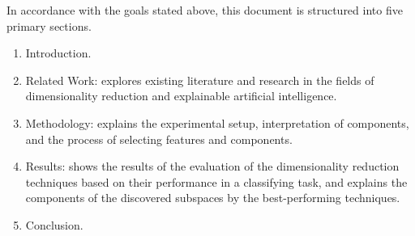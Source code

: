 In accordance with the goals stated above, this document is structured into five primary sections.
\begin{enumerate}
    \item Introduction.
    \item Related Work: explores existing literature and research in the fields of dimensionality reduction and explainable artificial intelligence.
    \item Methodology: explains the experimental setup, interpretation of components, and the process of selecting features and components.
    \item Results: shows the results of the evaluation of the dimensionality reduction techniques based on their performance in a classifying task, and explains the components of the discovered subspaces by the best-performing techniques.
    \item Conclusion.
\end{enumerate}